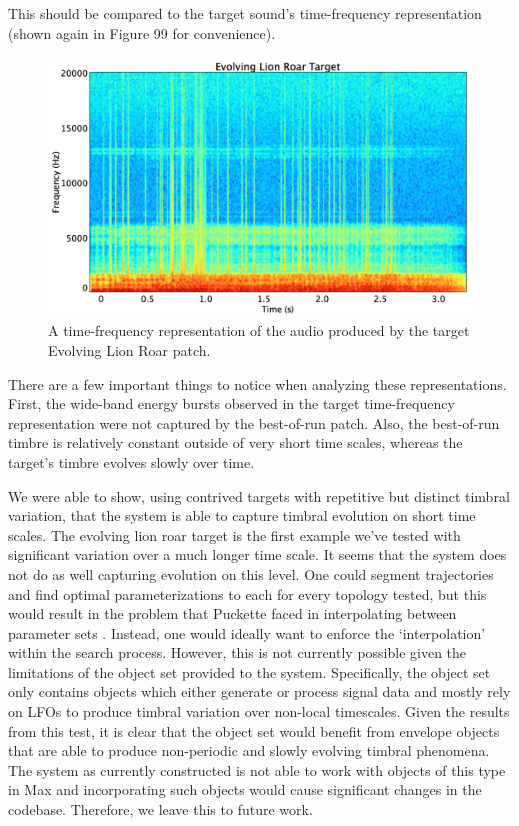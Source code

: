 \documentclass[12pt]{report} 	%
\numberwithin{figure}{chapter}
\numberwithin{table}{chapter}
\numberwithin{equation}{chapter}
\begin{document}
\begin{flushleft}
\begin{figure}[h!]
\end{figure}
This should be compared to the target sound's time-frequency representation (shown again in Figure 99 for convenience).
\begin{figure}[h!]
\begin{center}
\includegraphics[scale=0.35,width=\linewidth]{EvolvingLionRoarTargetSTFT}
\caption[Target evolving lion roar time-frequency representation]{A time-frequency representation of the audio produced by the target Evolving Lion Roar patch.}
\end{center}
\end{figure}

There are a few important things to notice when analyzing these representations. First, the wide-band energy bursts observed in the target time-frequency representation were not captured by the best-of-run patch. Also, the best-of-run timbre is relatively constant outside of very short time scales, whereas the target's timbre evolves slowly over time. 

We were able to show, using contrived targets with repetitive but distinct timbral variation, that the system is able to capture timbral evolution on short time scales. The evolving lion roar target is the first example we've tested with significant variation over a much longer time scale. It seems that the system does not do as well capturing evolution on this level. One could segment trajectories and find optimal parameterizations to each for every topology tested, but this would result in the problem that Puckette faced in interpolating between parameter sets \cite{Puckette:2004zp}. Instead, one would ideally want to enforce the `interpolation' within the search process. However, this is not currently possible given the limitations of the object set provided to the system. Specifically, the object set only contains objects which either generate or process signal data and mostly rely on LFOs to produce timbral variation over non-local timescales. Given the results from this test, it is clear that the object set would benefit from envelope objects that are able to produce non-periodic and slowly evolving timbral phenomena. The system as currently constructed is not able to work with objects of this type in Max and incorporating such objects would cause significant changes in the codebase. Therefore, we leave this to future work.


\end{flushleft}
\end{document}

